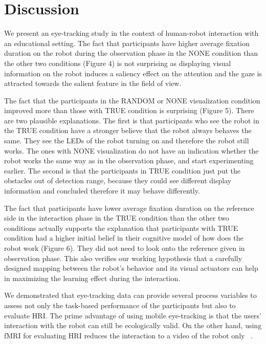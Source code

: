 \documentclass{sig-alternate}
\begin{document}

\section{Discussion}

We present an eye-tracking study in the context of human-robot
interaction with an educational setting. The fact that participants have
higher average fixation duration on the robot during the observation
phase in the NONE condition than the other two conditions (Figure 4) is
not surprising as displaying visual information on the robot induces a
saliency effect on the attention and the gaze is attracted towards the
salient feature in the field of view.

The fact that the participants in the RANDOM or NONE visualization
condition improved more than those with TRUE condition is surprising
(Figure 5). There are two plausible explanations. The first is that
participants who see the robot in the TRUE condition have a stronger
believe that the robot always behaves the same. They see the LEDs of the
robot turning on and therefore the robot still works. The ones with NONE
visualization do not have an indication whether the robot works the same
way as in the observation phase, and start experimenting earlier. The
second is that the participants in TRUE condition just put the obstacles
out of detection range, because they could see different display
information and concluded therefore it may behave differently.

The fact that participants have lower average fixation duration on the
reference side in the interaction phase in the TRUE condition than the
other two conditions actually supports the explanation that participants
with TRUE condition had a higher initial belief in their cognitive model
of how does the robot work (Figure 6). They did not need to look onto
the reference given in observation phase. This also verifies our working
hypothesis that a carefully designed mapping between the robot's
behavior and its visual actuators can help in maximizing the learning
effect during the interaction.

We demonstrated that eye-tracking data can provide several process
variables to assess not only the task-based performance of the
participants but also to evaluate HRI. The prime advantage of using
mobile eye-tracking is that the users' interaction with the robot can
still be ecologically valid. On the other hand, using fMRI for
evaluating HRI reduces the interaction to a video of the robot only
~\cite{rosenthal2013neural}.
\end{document}
